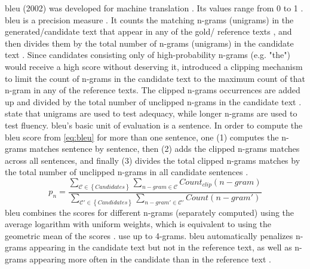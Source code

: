 
\ac{bleu} (2002) was developed for machine translation \citep{palivela_optimization_2021,zhou_paraphrase_2021,papineni_bleu_2001}.
Its values range from 0 to 1 \citep{papineni_bleu_2001}.
\ac{bleu} is a precision measure \citep{kurt_pehlivanoglu_comparative_2024,papineni_bleu_2001}.
It counts the matching n-grams (unigrams) in the generated/candidate text that appear in any of the gold/ reference texts \citep{palivela_optimization_2021,papineni_bleu_2001}, 
and then divides them by the total number of n-grams (unigrams) in the candidate text \citep{papineni_bleu_2001}.
Since candidates consisting only of high-probability n-grams (e.g. "the") would receive a high score without deserving it, 
\citet{papineni_bleu_2001} introduced a clipping mechanism to limit the count of n-grams in the candidate text 
to the maximum count of that n-gram in any of the reference texts.
The clipped n-grams occurrences are added up and divided by the total number 
of unclipped n-grams in the candidate text \citep{papineni_bleu_2001}.
\citet{papineni_bleu_2001} state that unigrams are used to test adequacy, while longer n-grams are used to test fluency.
\ac{bleu}'s basic unit of evaluation is a sentence. 
In order to compute the \ac{bleu} score from \autoref{eq:bleu} for more than one sentence, 
one (1) computes the n-grams matches sentence by sentence, 
then (2) adds the clipped n-grams matches across all sentences, 
and finally (3) divides the total clipped n-grams matches by 
the total number of unclipped n-grams in all candidate sentences \citep{papineni_bleu_2001}.
\begin{equation}
    p_n = \frac{\sum_{\mathcal{C} \in \left\{ Candidates \right\}}\sum_{n-gram \in\mathcal{C}}Count_{clip}(n-gram)}{\sum_{\mathcal{C'} \in \left\{ Candidates \right\}}\sum_{n-gram' \in\mathcal{C'}}Count(n-gram')}
\label{eq:bleu}
\end{equation}
\ac{bleu} combines the scores for different n-grams (separately computed) using the average logarithm with uniform weights, 
which is equivalent to using the geometric mean of the scores \citep{papineni_bleu_2001,banerjee_METEOR_2005}.
\citet{gohsen_captions_2023} use up to 4-grams.
\ac{bleu} automatically penalizes n-grams appearing in the candidate text but not in the reference text, 
as well as n-grams appearing more often in the candidate than in the reference text \citep{papineni_bleu_2001}.
